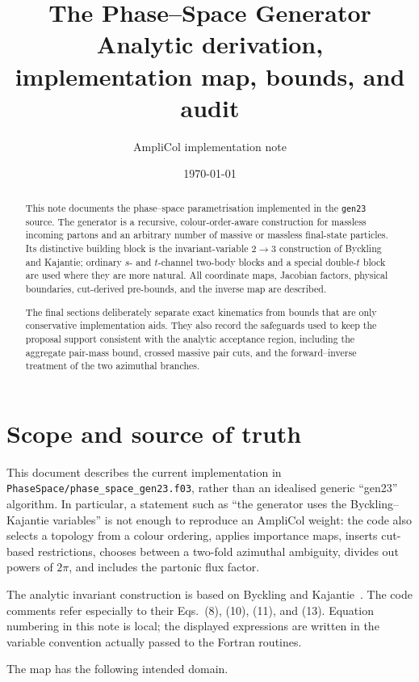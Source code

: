 \documentclass[11pt,a4paper]{article}
\title{The \code{gen23} Phase--Space Generator\\
       Analytic derivation, implementation map, bounds, and audit}
\author{AmpliCol implementation note}
\date{\today}
\newcommand{\code}[1]{\texttt{#1}}
\begin{document}
\maketitle

\begin{abstract}
This note documents the phase--space parametrisation implemented in the
\code{gen23} source.  The generator is a recursive,
colour-order-aware construction for massless incoming partons and an arbitrary
number of massive or massless final-state particles.  Its distinctive building
block is the invariant-variable $2\to3$ construction of Byckling and Kajantie;
ordinary $s$- and $t$-channel two-body blocks and a special double-$t$ block
are used where they are more natural.  All coordinate maps, Jacobian factors,
physical boundaries, cut-derived pre-bounds, and the inverse map are described.

The final sections deliberately separate exact kinematics from bounds that are
only conservative implementation aids.  They also record the safeguards used
to keep the proposal support consistent with the analytic acceptance region,
including the aggregate pair-mass bound, crossed massive pair cuts, and the
forward--inverse treatment of the two azimuthal branches.
\end{abstract}

\tableofcontents

\section{Scope and source of truth}

This document describes the current implementation in
\code{PhaseSpace/phase\_space\_gen23.f03}, rather than an idealised generic
``gen23'' algorithm.  In particular, a statement such as ``the generator uses
the Byckling--Kajantie variables'' is not enough to reproduce an AmpliCol
weight: the code also selects a topology from a colour ordering, applies
importance maps, inserts cut-based restrictions, chooses between a two-fold
azimuthal ambiguity, divides out powers of $2\pi$, and includes the partonic
flux factor.

The analytic invariant construction is based on
Byckling and Kajantie~\cite{BK}.  The code comments refer especially to their
Eqs.~(8), (10), (11), and (13).  Equation numbering in this note is local;
the displayed expressions are written in the variable convention actually
passed to the Fortran routines.

The map has the following intended domain.
\end{document}
